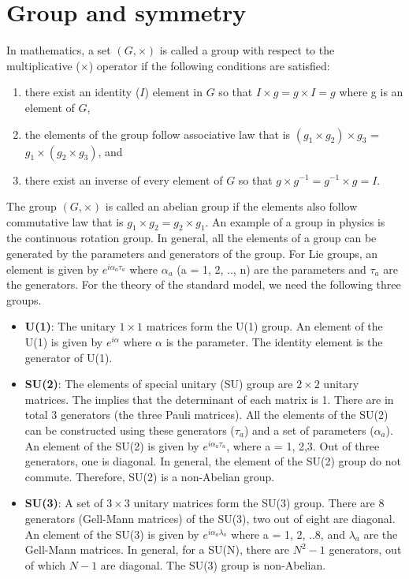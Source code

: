 
\section{Group and symmetry}
\label{s:smGroup}
In mathematics, a set $(G, \times)$ is called a group with respect to the 
multiplicative ($\times$) operator if the following conditions are satisfied: 
\begin{enumerate}
\item there exist an identity ($I$) element in $G$ so that $I\times g = g\times I = 
g$ where g is an element of $G$, 
\item the elements of the group follow associative 
law that is $(g_1\times g_2)\times g_3$ = $g_1\times (g_2\times g_3)$, and 
\item there exist an inverse of every element of $G$ so that $g\times g^{-1} = g^{-1}\times g = I$. 
\end{enumerate}
The group $(G, \times)$ is called an abelian group if 
the elements also follow commutative law that is $g_1\times g_2 = g_2\times g_1$. An example of a group in physics is the continuous rotation group. In general,
all the elements of a group can be generated by the parameters and generators 
of the group. For Lie groups, an element is given by $e^{i\alpha_a\tau_a}$ where
$\alpha_a$ (a = 1, 2, .., n) are the parameters and $\tau_a$ are the generators. For the theory 
of the standard model, we need the following three groups.
\begin{itemize} [leftmargin=*]
				\item \textbf{U(1)}: The unitary $1\times 1$ matrices form the U(1) 
								group. An element of the U(1) is given by $e^{i\alpha}$ where 
								$\alpha$ is the parameter. The identity element is the 
								generator of U(1).
				\item \textbf{SU(2)}: The elements of special unitary (SU) group are 
								$2\times 2$ unitary matrices. The  implies that the
								determinant of each matrix is 1. There are in total 3 generators
								(the three Pauli matrices). All the elements of the SU(2) can be 
								constructed using these generators ($\tau_a$) and a set of 
								parameters ($\alpha_a$). An element of the SU(2) is given by 
								$e^{i\alpha_a\tau_a}$, where a = 1, 2,3. Out of three generators,
								one is diagonal. In general, the element of the SU(2) group do not 
								commute. Therefore, SU(2) is a non-Abelian group.
				\item \textbf{SU(3)}: A set of $3\times 3$ unitary matrices form the
								SU(3) group. There are 8 generators (Gell-Mann matrices) of the
								SU(3), two out of eight are diagonal. An element of the SU(3) 
								is given by $e^{i\alpha_a\lambda_a}$ where a = 1, 2, ..8, and
								$\lambda_a$ are the Gell-Mann matrices. In general, for a SU(N), 
								there are $N^2 -1$ generators, out of which $N-1$ are diagonal. 
								The SU(3) group is non-Abelian.
\end{itemize}

